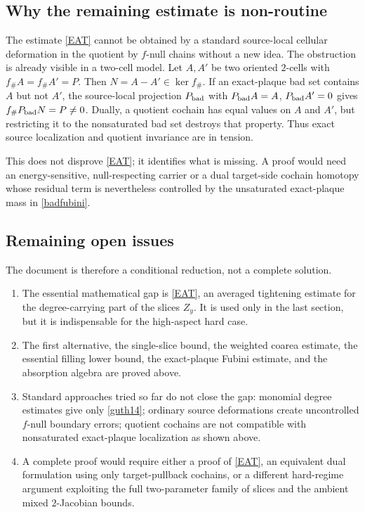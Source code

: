 \documentclass[12pt]{article}
\begin{document}
\subsection*{Why the remaining estimate is non-routine}

The estimate \eqref{EAT} cannot be obtained by a standard source-local
cellular deformation in the quotient by \(f\)-null chains without a new idea.
The obstruction is already visible in a two-cell model.  Let \(A,A'\) be two
oriented \(2\)-cells with \(f_\#A=f_\#A'=P\).  Then \(N=A-A'\in\ker f_\#\).
If an exact-plaque bad set contains \(A\) but not \(A'\), the source-local
projection \(P_{\rm bad}\) with \(P_{\rm bad}A=A\), \(P_{\rm bad}A'=0\) gives
\(f_\#P_{\rm bad}N=P\ne0\).  Dually, a quotient cochain has equal values on
\(A\) and \(A'\), but restricting it to the nonsaturated bad set destroys that
property.  Thus exact source localization and quotient invariance are in
tension.

This does not disprove \eqref{EAT}; it identifies what is missing.  A proof
would need an energy-sensitive, null-respecting carrier or a dual target-side
cochain homotopy whose residual term is nevertheless controlled by the
unsaturated exact-plaque mass in \eqref{badfubini}.

\subsection*{Remaining open issues}

The document is therefore a conditional reduction, not a complete solution.

\begin{enumerate}
\item The essential mathematical gap is \eqref{EAT}, an averaged tightening
estimate for the degree-carrying part of the slices \(Z_y\).  It is used only
in the last section, but it is indispensable for the high-aspect hard case.

\item The first alternative, the single-slice bound, the weighted coarea
estimate, the essential filling lower bound, the exact-plaque Fubini estimate,
and the absorption algebra are proved above.

\item Standard approaches tried so far do not close the gap: monomial
degree estimates give only \eqref{guth14}; ordinary source deformations create
uncontrolled \(f\)-null boundary errors; quotient cochains are not compatible
with nonsaturated exact-plaque localization as shown above.

\item A complete proof would require either a proof of \eqref{EAT}, an
equivalent dual formulation using only target-pullback cochains, or a different
hard-regime argument exploiting the full two-parameter family of slices and the
ambient mixed \(2\)-Jacobian bounds.
\end{enumerate}
\end{document}
